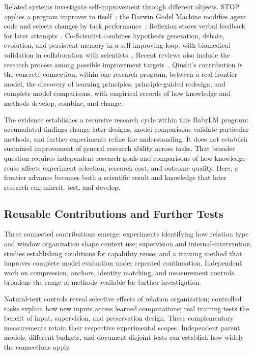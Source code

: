 Related systems investigate self-improvement through different objects. STOP applies a program improver to itself~\citep{zelikman2024stop}; the Darwin G\"odel Machine modifies agent code and selects changes by task performance~\citep{zhang2026dgm}; Reflexion stores verbal feedback for later attempts~\citep{shinn2023reflexion}. Co-Scientist combines hypothesis generation, debate, evolution, and persistent memory in a self-improving loop, with biomedical validation in collaboration with scientists~\citep{gottweis2026coscientist}. Recent reviews also include the research process among possible improvement targets~\citep{chen2026recursive}. Qiushi's contribution is the concrete connection, within one research program, between a real frontier model, the discovery of learning principles, principle-guided redesign, and complete model comparisons, with empirical records of how knowledge and methods develop, combine, and change.

The evidence establishes a recursive research cycle within this BabyLM program: accumulated findings change later designs, model comparisons validate particular methods, and further experiments refine the understanding. It does not establish sustained improvement of general research ability across tasks. That broader question requires independent research goals and comparisons of how knowledge reuse affects experiment selection, research cost, and outcome quality. Here, a frontier advance becomes both a scientific result and knowledge that later research can inherit, test, and develop.

\subsection{Reusable Contributions and Further Tests}

Three connected contributions emerge: experiments identifying how relation type and window organization shape context use; supervision and internal-intervention studies establishing conditions for capability reuse; and a training method that improves complete model evaluation under repeated continuation. Independent work on compression, anchors, identity matching, and measurement controls broadens the range of methods available for further investigation.

Natural-text controls reveal selective effects of relation organization; controlled tasks explain how new inputs access learned computations; real training tests the benefit of input, supervision, and preservation design. These complementary measurements retain their respective experimental scopes. Independent parent models, different budgets, and document-disjoint tests can establish how widely the connections apply.

